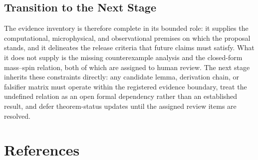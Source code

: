 \documentclass[conference]{IEEEtran}
\begin{document}
\subsection{Transition to the Next Stage}
The evidence inventory is therefore complete in its bounded role: it supplies the computational, microphysical, and observational premises on which the proposal stands, and it delineates the release criteria that future claims must satisfy. What it does not supply is the missing counterexample analysis and the closed-form mass--spin relation, both of which are assigned to human review. The next stage inherits these constraints directly: any candidate lemma, derivation chain, or falsifier matrix must operate within the registered evidence boundary, treat the undefined relation as an open formal dependency rather than an established result, and defer theorem-status updates until the assigned review items are resolved.\section*{References}


\end{document}
